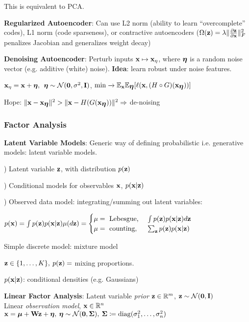     \tab This is equivalent to PCA.
    
    \textbf{Regularized Autoencoder}: Can use L2 norm (ability to learn ``overcomplete'' codes), L1 norm (code sparseness), or contractive autoencoders ($\Omega(\mathbf z)=\lambda\lVert \pdv{\mathbf z}{\mathbf x} \rVert^2_F$ penalizes Jacobian and generalizes weight decay)
    
    \textbf{Denoising Autoencoder}: Perturb inputs $\mathbf x\mapsto\mathbf x_\eta$, where $\mbox{\boldmath $\eta$}$ is a random noise vector (e.g. additive (white) noise). \textbf{Idea}: learn robust under noise features.
    
    \tab $\mathbf x_\eta=\mathbf x+\mbox{\boldmath $\eta$},\>\>\mbox{\boldmath $\eta$}\sim\mathcal{N}(\mathbf{0},\sigma^2,\mathbf I)$, $\min\xrightarrow{}\mathbb E_{\mathbf x}\mathbb E_{\mbox{\boldmath $\eta$}} \lbrack\ell(\mathbf x,(H\circ G)(\mathbf x_{\mbox{\boldmath $\eta$}})) \rbrack$
    
    \tab Hope: $\lVert\mathbf x-\mathbf x_{\mbox{\boldmath $\eta$}} \rVert^2 > \lVert\mathbf x - H(G(\mathbf x_{\mbox{\boldmath $\eta$}}))\rVert^2 \Rightarrow$ de-noising
    
    
    
    \subsubsection{Factor Analysis}
    \label{ssub:factoranalysis}
    
    \textbf{Latent Variable Models}: Generic way of defining probabilistic i.e. generative models: latent variable models.
    
    ) Latent variable $\mathbf z$, with distribution $p(\mathbf z)$
    
    ) Conditional models for observables $\mathbf x$, $p(\mathbf x|\mathbf z)$
    
    ) Observed data model: integrating/summing out latent variables:
    
    \tab $p(\mathbf x)=\int p(\mathbf z)p(\mathbf x|\mathbf z)\mu(d\mathbf z) = \begin{cases} \mu = \text{ Lebesgue, } & \int p(\mathbf z)p(\mathbf x|\mathbf z)d\mathbf z \\ \mu=\text{ counting, } & \sum_\mathbf z p(\mathbf z)p(\mathbf x|\mathbf z) \end{cases}$
    
    Simple discrete model: mixture model
    
    \tab $\mathbf z\in \{1,\ldots,K\},\> p(\mathbf z)=$ mixing proportions.
    
    \tab $p(\mathbf x|\mathbf z)$: conditional densities (e.g. Gaussians)
    
    \textbf{Linear Factor Analysis}: 
    \tab Latent variable \emph{prior} $\mathbf z\in\mathbb R^m$, $\mathbf z\sim\mathcal{N}(\mathbf{0},\mathbf I)$\\
    Linear \emph{observation model}, $\mathbf x\in\mathbb R^n$ \\
    \tab$\mathbf x=\mbox{\boldmath $\mu$}+\mathbf W\mathbf z+\mbox{\boldmath $\eta$},\>\mbox{\boldmath $\eta$}\sim\mathcal{N}(\mathbf{0},\mathbf \Sigma),\>\mathbf \Sigma\coloneqq{\mathop{\mathrm{diag}}}(\sigma^2_1,\ldots,\sigma^2_n)$
    
